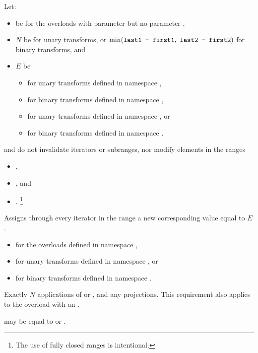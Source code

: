 \begin{itemdescr}
\pnum
Let:
\begin{itemize}
\setlength{\emergencystretch}{1em}
\item
   be 
  for the overloads with parameter 
  but no parameter ,
\item
  $N$ be  for unary transforms, or
  $\min(\texttt{last1 - first1}, \ \texttt{last2 - first2})$ for binary transforms, and
\item
  $E$ be
  \begin{itemize}
  \item
    for unary transforms defined in namespace ,
  \item
    for binary transforms defined in namespace ,
  \item
    for unary transforms defined in namespace , or
  \item
    for binary transforms defined in namespace .
  \end{itemize}
\end{itemize}

\pnum
\expects
{} and  do not invalidate iterators or subranges, nor
modify elements in the ranges
\begin{itemize}
\item {},
\item {}, and
\item {}.%
\footnote{The use of fully closed ranges is intentional.}
\end{itemize}

\pnum
\effects
Assigns through every iterator 
in the range 
a new corresponding value equal to $E$.

\pnum
\returns
\begin{itemize}
\item
  for the overloads defined in namespace ,
\item
  for unary transforms defined in namespace , or
\item {}
  for binary transforms defined in namespace .
\end{itemize}

\pnum
\complexity
Exactly $N$ applications of  or , and
any projections.
This requirement also applies to the overload with an .

\pnum
\remarks
{} may be equal to  or .
\end{itemdescr}

